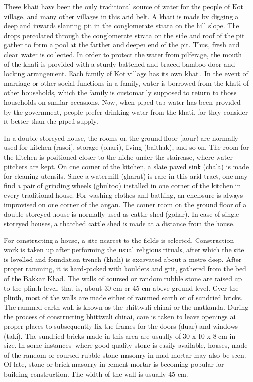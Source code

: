 These khati have been the only traditional source of water for the people of Kot village, and many other villages in this arid belt. A khati is made by digging a deep and inwards slanting pit in the conglomerate strata on the hill slope. The drops percolated through the conglomerate strata on the side and roof of the pit gather to form a pool at the farther and deeper end of the pit. Thus, fresh and clean water is collected. In order to protect the water from pilferage, the mouth of the khati is provided with a sturdy battened and braced bamboo door and locking arrangement. Each family of Kot village has its own khati. In the event of marriage or other social functions in a family, water is borrowed from the khati of other households, which the family is customarily supposed to return to those households on similar occasions. Now, when piped tap water has been provided by the government, people prefer drinking water from the khati, for they consider it better than the piped supply.

In a double storeyed house, the rooms on the ground floor (aour) are normally used for kitchen (rasoi), storage (ohari), living (baithak), and so on. The room for the kitchen is positioned closer to the niche under the staircase, where water pitchers are kept. On one corner of the kitchen, a slate paved sink (chala) is made for cleaning utensils. Since a watermill (gharat) is rare in this arid tract, one may find a pair of grinding wheels (ghultoo) installed in one corner of the kitchen in every traditional house. For washing clothes and bathing, an enclosure is always improvised on one corner of the angan. The corner room on the ground floor of a double storeyed house is normally used as cattle shed (gohar). In case of single storeyed houses, a thatched cattle shed is made at a distance from the house.

For constructing a house, a site nearest to the fields is selected. Construction work is taken up after performing the usual religious rituals, after which the site is levelled and foundation trench (khali) is excavated about a metre deep. After proper ramming, it is hard-packed with boulders and grit, gathered from the bed of the Bakkar Khad. The walls of coursed or random rubble stone are raised up to the plinth level, that is, about 30 cm or 45 cm above ground level. Over the plinth, most of the walls are made either of rammed earth or of sundried bricks. The rammed earth wall is known as the bhittwali chinai or the matkanda. During the process of constructing bhittwali chinai, care is taken to leave openings at proper places to subsequently fix the frames for the doors (duar) and windows (taki). The sundried bricks made in this area are usually of 30 x 10 x 8 cm in size. In some instances, where good quality stone is easily available, houses, made of the random or coursed rubble stone masonry in mud mortar may also be seen. Of late, stone or brick masonry in cement mortar is becoming popular for building construction. The width of the wall is usually 45 cm.

